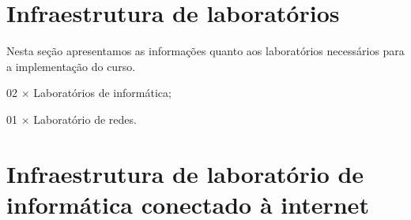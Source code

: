 \documentclass[
	12pt,				%
	openright,			%
	twoside,			%
	a4paper,			%
	chapter=TITLE,		%
	english,			%
	french,				%
	spanish,			%
	brazil,				%
	]{abntex2}
\begin{document}
\begin{table}[htpb]
\end{table}



\section{Infraestrutura de laboratórios}

Nesta seção apresentamos as informações quanto aos laboratórios necessários para a implementação do
curso.

\begin{alineas}
	\item 02 $\times$ Laboratórios de informática;
	\item 01 $\times$ Laboratório de redes.
\end{alineas}

\section{Infraestrutura de laboratório de informática conectado à internet}
\end{document}
